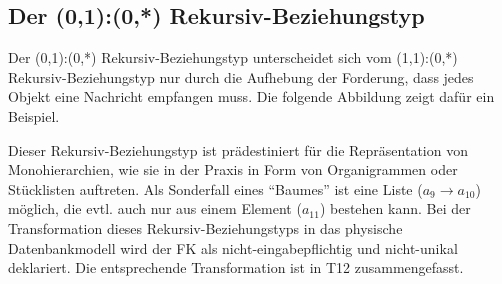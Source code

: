\subsection{Der (0,1):(0,*) Rekursiv-Beziehungstyp}
Der (0,1):(0,*) Rekursiv-Beziehungstyp unterscheidet sich vom (1,1):(0,*) Rekursiv-Be\-zieh\-ungs\-typ nur durch die Aufhebung der Forderung, dass jedes Objekt eine Nachricht empfangen muss. Die folgende Abbildung zeigt dafür ein Beispiel.
\begin{center}
\end{center}
Dieser Rekursiv-Beziehungstyp ist prädestiniert für die Repräsentation von Monohierarchien, wie sie in der Praxis in Form von Organigrammen oder Stücklisten auftreten. Als Sonderfall eines \enquote{Baumes} ist eine Liste ($a_{9} \rightarrow a_{10}$) möglich, die evtl. auch nur aus einem Element ($a_{11}$) bestehen kann. Bei der Transformation dieses Rekursiv-Beziehungstyps in das physische Datenbankmodell wird der FK als nicht-eingabepflichtig und nicht-unikal deklariert. Die entsprechende Transformation ist in T12 zusammengefasst.
